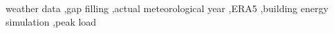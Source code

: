 weather data \sep gap filling \sep actual meteorological year \sep ERA5 \sep building energy simulation \sep peak load

